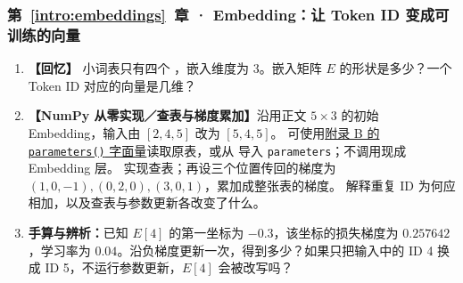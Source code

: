 \subsubsection*{第~\ref*{intro:embeddings}~章 · Embedding：让 Token ID 变成可训练的向量}
\begin{enumerate}[label={},leftmargin=4.8em,itemsep=4pt]
\item[\textbf{C-048.}] \leavevmode{}\label{exercise:C-048}\label{exercise:embedding-shape}\textbf{【回忆】} 小词表只有四个 ，嵌入维度为 3。嵌入矩阵 $E$ 的形状是多少？一个 Token ID 对应的向量是几维？
\item[\textbf{C-049.}] \leavevmode{}\label{exercise:C-049}\label{exercise:embedding-input-change}\textbf{【NumPy 从零实现／查表与梯度累加】}沿用正文 $5\times3$ 的初始 Embedding，输入由 $[2,4,5]$ 改为 $[5,4,5]$。
可使用\hyperref[app:parameter-literal]{附录 B 的 \texttt{parameters()} 字面量}读取原表，或从  导入 \texttt{parameters}；不调用现成 Embedding 层。
实现查表；再设三个位置传回的梯度为 $(1,0,-1),(0,2,0),(3,0,1)$，累加成整张表的梯度。
解释重复 ID 为何应相加，以及查表与参数更新各改变了什么。
\item[\textbf{C-050.}] \leavevmode{}\label{exercise:C-050}\label{exercise:embedding-update}\textbf{手算与辨析：}已知 $E[4]$ 的第一坐标为 $-0.3$，该坐标的损失梯度为 $0.257642$，学习率为 $0.04$。沿负梯度更新一次，得到多少？如果只把输入中的 ID 4 换成 ID 5，不运行参数更新，$E[4]$ 会被改写吗？
\end{enumerate}
